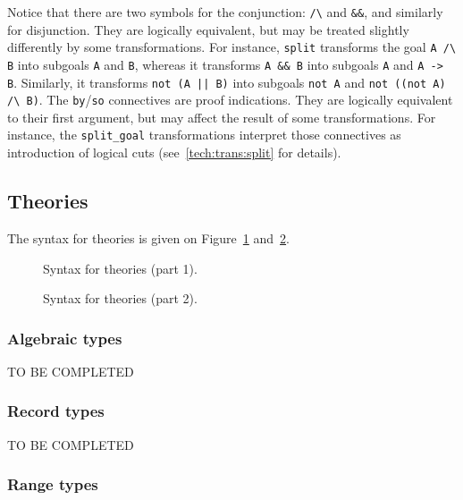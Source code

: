 Notice that there are two symbols for the conjunction: \verb|/\|
and \verb|&&|, and similarly for disjunction. They are logically
equivalent, but may be treated slightly differently by some
transformations. For instance, \texttt{split} transforms the goal
\verb|A /\ B| into subgoals \verb|A| and \verb|B|, whereas it transforms
\verb|A && B| into subgoals \verb|A| and \verb|A -> B|. Similarly, it
transforms \verb!not (A || B)! into subgoals \verb|not A| and
\verb|not ((not A) /\ B)|.
The \texttt{by}/\texttt{so} connectives are proof indications. They are
logically equivalent to their first argument, but may affect the result
of some transformations. For instance, the \texttt{split\_goal}
transformations interpret those connectives as introduction of logical cuts
 (see~\ref{tech:trans:split} for details).

\subsection{Theories}

The syntax for theories is given on Figure~\ref{fig:bnf:theorya} and~\ref{fig:bnf:theoryb}.

\begin{figure}
  \begin{center}\framebox{}\end{center}
  \caption{Syntax for theories (part 1).}
\label{fig:bnf:theorya}
\end{figure}

\begin{figure}
  \begin{center}\framebox{}\end{center}
  \caption{Syntax for theories (part 2).}
\label{fig:bnf:theoryb}
\end{figure}

\subsubsection{Algebraic types}

TO BE COMPLETED

\subsubsection{Record types}

TO BE COMPLETED

\subsubsection{Range types}
\label{sec:rangetypes}

